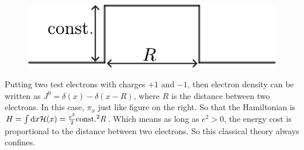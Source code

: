 \documentclass[a4paper,11pt]{article}
\begin{document}
\begin{figure}
    \centering
    \includegraphics[width = 0.8\linewidth]{step.pdf}
    \label{step}
\end{figure}
Putting two test electrons with charges $+1$ and $-1$, then electron density can be written as $J^0 = \delta(x) - \delta(x-R)$, where $R$ is the distance between two electrons. In this case, $\pi_x$ just like figure on the right. So that the Hamiltonian is $H = \int {\rm d}x \mathcal{H}(x) = \frac{e^2}{2} {\rm const.}^2 R$. Which means as long as $e^2 >0$, the energy cost is proportional to the distance between two electrons. So this classical theory always confines.
\end{document}
